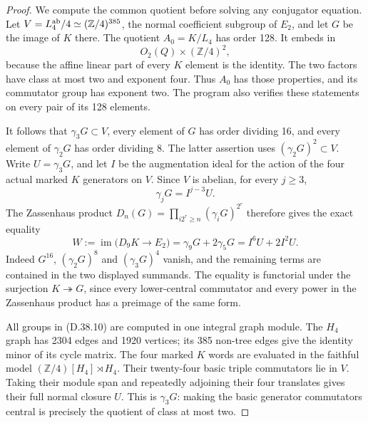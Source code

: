 \begin{proof}
We compute the common quotient before solving any
conjugator equation. Let
$V=L_4^{\rm ab}/4\simeq(\mathbb Z/4)^{385}$, the normal
coefficient subgroup of $E_2$, and let $G$ be the image
of $K$ there. The quotient $A_0=K/L_4$ has order 128.
It embeds in
\[
 O_2(Q)\times(\mathbb Z/4)^2,
                                                               \tag{D.38.8}
\]
because the affine linear part of every $K$ element is
the identity. The two factors have class at most two
and exponent four. Thus $A_0$ has those properties,
and its commutator group has exponent two. The program
also verifies these statements on every pair of its
128 elements.

It follows that $\gamma_3G\subset V$, every element of
$G$ has order dividing 16, and every element of
$\gamma_2G$ has order dividing 8. The latter assertion
uses $(\gamma_2G)^2\subset V$. Write $U=\gamma_3G$,
and let $I$ be the augmentation ideal for the action
of the four actual marked $K$ generators on $V$.
Since $V$ is abelian, for every $j\ge3$,
\[
 \gamma_jG=I^{j-3}U.
                                                               \tag{D.38.9}
\]
The Zassenhaus product
$D_n(G)=\prod_{i2^r\ge n}(\gamma_iG)^{2^r}$ therefore
gives the exact equality
\[
 W:=\operatorname{im}\bigl(D_9K\to E_2\bigr)
   =\gamma_9G+2\gamma_5G=I^6U+2I^2U.                     \tag{D.38.10}
\]
Indeed $G^{16}$, $(\gamma_2G)^8$ and
$(\gamma_3G)^4$ vanish, and the remaining terms are
contained in the two displayed summands. The equality
is functorial under the surjection $K\twoheadrightarrow G$,
since every lower-central commutator and every power
in the Zassenhaus product has a preimage of the same form.

All groups in (D.38.10) are computed in one integral
graph module. The $H_4$ graph has 2304 edges and 1920
vertices; its 385 non-tree edges give the identity
minor of its cycle matrix. The four marked $K$ words
are evaluated in the faithful model
$(\mathbb Z/4)[H_4]\rtimes H_4$. Their twenty-four
basic triple commutators lie in $V$. Taking their
module span and repeatedly adjoining their four
translates gives their full normal closure $U$.
This is $\gamma_3G$: making the basic generator
commutators central is precisely the quotient of
class at most two.


\end{proof}
